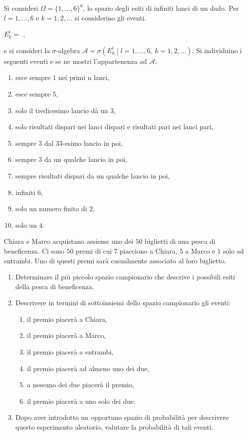 Si consideri $\Omega =\{1,\dots ,6\}^{k}$, lo spazio degli esiti di infiniti lanci di un dado. Per $l=1,\dots ,6$ e $k=1,2,\dots $ si considerino gli eventi.
\begin{center}
	$E_{k}^{l} =$ ,
\end{center}
e si consideri la $\sigma $-algebra $\mathcal{A} =\sigma \left( E_{k}^{l} \mid l=1,\dots ,6,\ k=1,2,\dots \right)$. Si individuino i seguenti eventi e se ne mostri l'appartenenza ad $\mathcal{A}$:
\begin{enumerate}
	\item esce sempre $1$ nei primi n lanci,
	\item esce sempre $5$,
	\item solo il tredicesimo lancio dà un $3$,
	\item solo risultati dispari nei lanci dispari e risultati pari nei lanci pari,
	\item sempre $3$ dal $33$-esimo lancio in poi,
	\item sempre $3$ da un qualche lancio in poi,
	\item sempre risultati dispari da un qualche lancio in poi,
	\item infiniti $6$,
	\item solo un numero finito di $2$,
	\item solo un $4$.
\end{enumerate}

\Esercizio{}

Chiara e Marco acquistano assieme uno dei $50$ biglietti di una pesca di beneficenza. Ci sono $50$ premi di cui $7$ piacciono a Chiara, $5$ a Marco e $1$ solo ad entrambi. Uno di questi premi sarà casualmente associato al loro biglietto.
\begin{enumerate}
	\item Determinare il più piccolo spazio campionario che descrive i possibili esiti della pesca di beneficenza.
	\item Descrivere in termini di sottoinsiemi dello spazio campionario gli eventi:
	\begin{enumerate}
		\item il premio piacerà a Chiara,
		\item il premio piacerà a Marco,
		\item il premio piacerà a entrambi,
		\item il premio piacerà ad almeno uno dei due,
		\item a nessuno dei due piacerà il premio,
		\item il premio piacerà a uno solo dei due.
	\end{enumerate}
	\item Dopo aver introdotto un opportuno spazio di probabilità per descrivere questo esperimento aleatorio, valutare la probabilità di tali eventi.
\end{enumerate}

